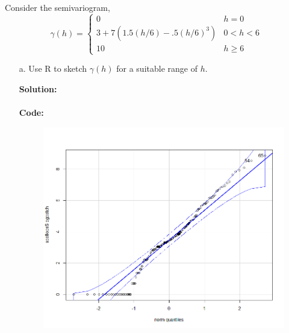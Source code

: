 \documentclass[12pt]{article}
\makeatletter
\theoremstyle{homework}
\newenvironment{exercise}[1]
{\def\@currentlabel{#1}\exercisecore}
{\endexercisecore}
\newcommand{\localhead}[1]{\par\smallskip\noindent\textbf{#1}\nobreak\\}%
\newcommand\solution{\localhead{Solution:}}
\makeatother
\begin{document}
\begin{exercise}{4} Consider the semivariogram,
  \begin{equation*}
    \gamma(h) = 
    \begin{cases}
      0 & h = 0\\
      3 + 7(1.5(h/6) - .5(h/6)^3) & 0 < h < 6\\
      10 & h \geq 6
    \end{cases}
  \end{equation*}
  \begin{enumerate}
    \item[a.] Use R to sketch $\gamma(h)$ for a suitable range of $h$.\\
    \solution  \\
    \textbf{Code:}
    \begin{center}
    
    \end{center}

    \begin{figure}[H]
      \begin{center}
      \includegraphics[width = .85\textwidth]{Rplot03.png}
      \end{center}
    \end{figure}



\end{enumerate}
\end{exercise}
\end{document}
